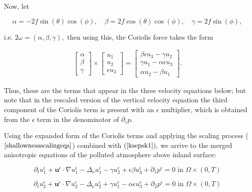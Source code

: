 \documentclass[11pt]{article}
\begin{document}
Now, let

$$\alpha = -2 f \sin(\theta)\cos(\phi), \quad \beta = 2 f \cos(\theta) \cos(\phi), \quad \gamma = 2 f \sin(\phi),$$

i.e. $2 \omega = (\alpha, \beta, \gamma),$ then using this, the Coriolis force takes the form

\begin{gather}
\begin{bmatrix} \alpha \\ \beta \\ \gamma \end{bmatrix}
 \times
 \begin{bmatrix} u_1 \\ u_2 \\ \epsilon u_3 \end{bmatrix}
 =
 \begin{bmatrix}  \beta \epsilon u_3 - \gamma u_2 \\ \gamma u_1 - \alpha \epsilon u_3  \\ \alpha u_2 - \beta u_1 \end{bmatrix}.
\end{gather}

Thus, these are the terms that appear in the three velocity equations below; but note that in the rescaled version of the vertical velocity equation the third component of the Coriolis term is present with an $\epsilon$ multiplier, which is obtained from the $\epsilon$ term in the denominator of $\partial_z p.$

Using the expanded form of the Coriolis terms and applying the scaling process ($\ref{shallownessscalingeqs}$) combined with $(\ref{ksepsk1}),$ we arrive to the merged anisotropic equations of the polluted atmosphere above inland surface:
  
    \begin{equation} \label{ANSC1}
    \partial_t u^\epsilon _1 + \mathbf{u}^\epsilon \cdot \nabla u^\epsilon _1 -\Delta_\nu u^\epsilon _1 -\gamma u_2^\epsilon + \epsilon \beta u_3^\epsilon + \partial_1 p^\epsilon = 0 \text{ in } \Omega \times (0,T)
    \end{equation}
    
    \begin{equation} \label{ANSC2}
    \partial_t u_2^\epsilon + \mathbf{u}^\epsilon \cdot \nabla u_2^\epsilon -\Delta_\nu u_2^\epsilon + \gamma u_1^\epsilon - \alpha \epsilon u^\epsilon_3  + \partial_2 p^\epsilon = 0 \text{ in } \Omega \times (0,T)
    \end{equation}
    
\end{document}
